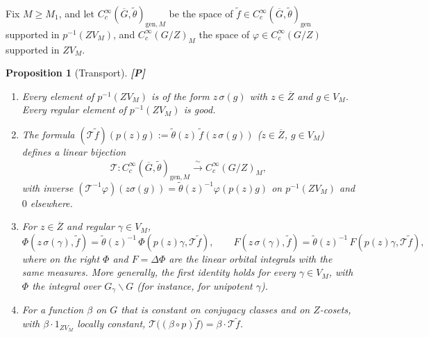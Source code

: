 \documentclass[12pt]{article}
\newcommand{\ov}[1]{\overline{#1}}
\newcommand{\gen}{\mathrm{gen}}
\newcommand{\Gb}{\ov{G}}
\newcommand{\Zb}{\ov{Z}}
\newcommand{\sg}{\sigma}
\newcommand{\Pv}{\textbf{[P]}}
\theoremstyle{plain}
\newtheorem{proposition}[theorem]{Proposition}
\theoremstyle{definition}
\begin{document}
Fix $M\ge M_1$, and let $C_c^\infty(\Gb,\tilde\theta)_{\gen,M}$ be the space of $\tilde f\in C_c^\infty(\Gb,\tilde\theta)_\gen$ supported in $p^{-1}(ZV_M)$, and $C_c^\infty(G/Z)_M$ the space of $\varphi\in C_c^\infty(G/Z)$ supported in $ZV_M$.

\begin{proposition}[Transport]\label{prop:transport}\Pv
\begin{enumerate}[label=(\alph*)]
\item Every element of $p^{-1}(ZV_M)$ is of the form $z\,\sg(g)$ with $z\in\Zb$ and $g\in V_M$. Every regular element of $p^{-1}(ZV_M)$ is good.
\item The formula $(\mathcal T\tilde f)(p(z)g):=\tilde\theta(z)\,\tilde f(z\,\sg(g))$ ($z\in\Zb$, $g\in V_M$) defines a linear bijection
\[ \mathcal T:C_c^\infty(\Gb,\tilde\theta)_{\gen,M}\xrightarrow{\ \sim\ }C_c^\infty(G/Z)_M, \]
with inverse $(\mathcal T^{-1}\varphi)(z\sg(g))=\tilde\theta(z)^{-1}\varphi(p(z)g)$ on $p^{-1}(ZV_M)$ and $0$ elsewhere.
\item For $z\in\Zb$ and regular $\gamma\in V_M$,
\[ \Phi(z\,\sg(\gamma),\tilde f)=\tilde\theta(z)^{-1}\,\Phi(p(z)\gamma,\mathcal T\tilde f),\qquad F(z\,\sg(\gamma),\tilde f)=\tilde\theta(z)^{-1}\,F(p(z)\gamma,\mathcal T\tilde f), \]
where on the right $\Phi$ and $F=\Delta\Phi$ are the linear orbital integrals with the same measures. More generally, the first identity holds for every $\gamma\in V_M$, with $\Phi$ the integral over $G_\gamma\backslash G$ (for instance, for unipotent $\gamma$).
\item For a function $\beta$ on $G$ that is constant on conjugacy classes and on $Z$-cosets, with $\beta\cdot1_{ZV_M}$ locally constant, $\mathcal T\big((\beta\circ p)\tilde f\big)=\beta\cdot\mathcal T\tilde f$.
\end{enumerate}
\end{proposition}
\end{document}
